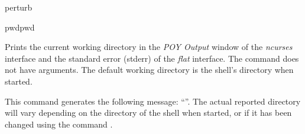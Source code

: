 \begin{command}{perturb}{}
\begin{poyexamples}
	\end{poyexamples}
               
	\begin{poyalso}
	\end{poyalso}
	
\end{command}

   
\begin{command}{pwd}{pwd}

	\syntax{\obligatory{()}}
	
	\begin{poydescription}
         Prints the current working directory in the \emph{POY Output} window of
         the \emph{ncurses} interface and the standard error (stderr) of the \emph{flat} interface.
         The command  does not have arguments. The default
         working directory is the shell's directory when \poy started.
	\end{poydescription}
	
	\begin{poyexamples}
		\poyexample{pwd()}
            {This command generates the following message: ``''. The actual reported
            directory will vary depending on the directory of the shell when
            \poy started, or if it has been changed using the command
            .}
    \end{poyexamples}

    \begin{poyalso}
    \end{poyalso}

\end{command}

   
